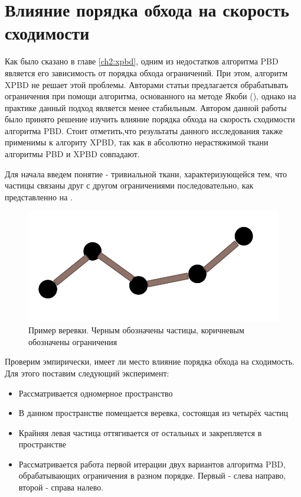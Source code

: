\section{Влияние порядка обхода на скорость сходимости} \label{ch3:order}
	Как было сказано в главе \ref{ch2:xpbd}, одним из недостатков алгоритма PBD является его зависимость от порядка обхода ограничений. При этом, алгоритм XPBD не решает этой проблемы. Авторами статьи \cite{muller2020detailed} предлагается обрабатывать ограничения при помощи алгоритма, основанного на методе Якоби (), однако на практике данный подход является менее стабильным. Автором данной работы было принято решение изучить влияние порядка обхода на скорость сходимости алгоритма PBD. Стоит отметить,что результаты данного исследования также применимы к алгориту XPBD, так как в абсолютно нерастяжимой ткани алгоритмы PBD и XPBD совпадают.
	
	Для начала введем понятие  - тривиальной ткани, характеризующейся тем, что частицы связаны друг с другом ограничениями  последовательно, как представленно на .
	
	\begin{figure}[ht!] 
		\center
		\includegraphics [scale=0.5] {my_folder/images//rope}
		\caption{Пример веревки. Черным обозначены частицы, коричневым обозначены ограничения}
		\label{fig:rope}  
	\end{figure}
	
	Проверим эмпирически, имеет ли место влияние порядка обхода на сходимость. Для этого поставим следующий эксперимент:
	\begin{itemize}
		\item Рассматривается одномерное пространство
		\item В данном пространстве помещается веревка, состоящая из четырёх частиц
		\item Крайняя левая частица оттягивается от остальных и закрепляется в пространстве
		\item Рассматривается работа первой итерации двух вариантов алгоритма PBD, обрабатывающих ограничения в разном порядке. Первый - слева направо, второй - справа налево.
	\end{itemize}
	
